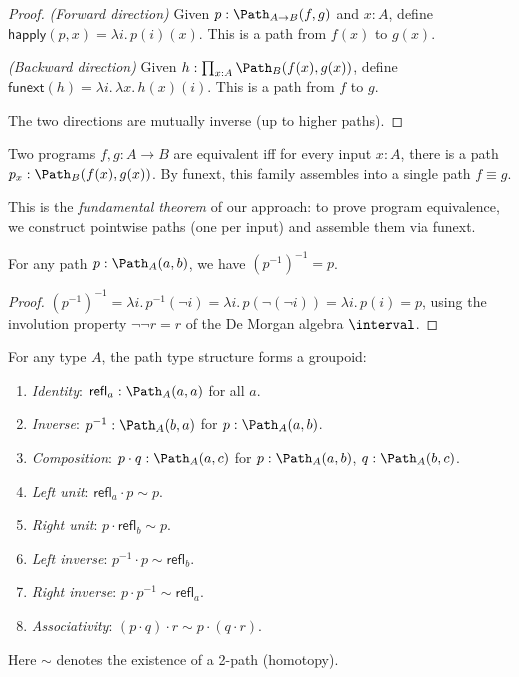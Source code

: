 \begin{proof}
\emph{(Forward direction)} Given $p : \Path_{A \to B}(f, g)$ and
$x : A$, define $\mathsf{happly}(p, x) = \lambda i.\, p(i)(x)$.
This is a path from $f(x)$ to $g(x)$.

\emph{(Backward direction)} Given
$h : \prod_{x : A} \Path_B(f(x), g(x))$, define
$\mathsf{funext}(h) = \lambda i.\, \lambda x.\, h(x)(i)$.
This is a path from $f$ to $g$.

The two directions are mutually inverse (up to higher paths).
\end{proof}

\begin{corollary}
\label{cor:prog-equiv}
Two programs $f, g : A \to B$ are equivalent iff for every input
$x : A$, there is a path $p_x : \Path_B(f(x), g(x))$.  By funext,
this family assembles into a single path $f \equiv g$.
\end{corollary}

This is the \emph{fundamental theorem} of our approach: to prove
program equivalence, we construct pointwise paths (one per input)
and assemble them via funext.

\begin{lemma}
\label{lem:path-inv-invol}
For any path $p : \Path_A(a, b)$, we have $(p^{-1})^{-1} = p$.
\end{lemma}

\begin{proof}
$(p^{-1})^{-1} = \lambda i.\, p^{-1}(\lnot i) = \lambda i.\, p(\lnot(\lnot i))
= \lambda i.\, p(i) = p$, using the involution property $\lnot \lnot r = r$
of the De Morgan algebra $\interval$.
\end{proof}

\begin{theorem}
\label{thm:path-groupoid}
For any type $A$, the path type structure forms a groupoid:
\begin{enumerate}
  \item \emph{Identity}: $\mathsf{refl}_a : \Path_A(a, a)$ for all $a$.
  \item \emph{Inverse}: $p^{-1} : \Path_A(b, a)$ for $p : \Path_A(a, b)$.
  \item \emph{Composition}: $p \cdot q : \Path_A(a, c)$ for $p : \Path_A(a, b)$,
    $q : \Path_A(b, c)$.
  \item \emph{Left unit}: $\mathsf{refl}_a \cdot p \sim p$.
  \item \emph{Right unit}: $p \cdot \mathsf{refl}_b \sim p$.
  \item \emph{Left inverse}: $p^{-1} \cdot p \sim \mathsf{refl}_b$.
  \item \emph{Right inverse}: $p \cdot p^{-1} \sim \mathsf{refl}_a$.
  \item \emph{Associativity}: $(p \cdot q) \cdot r \sim p \cdot (q \cdot r)$.
\end{enumerate}
Here $\sim$ denotes the existence of a 2-path (homotopy).
\end{theorem}


